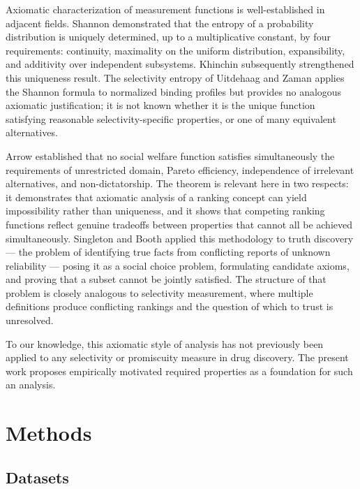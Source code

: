 \documentclass[journal=jcisd8,manuscript=article]{achemso}
\begin{document}
Axiomatic characterization of measurement functions is well-established in
adjacent fields.
Shannon\cite{Shannon1948} demonstrated that the entropy of a probability
distribution is uniquely determined, up to a multiplicative constant, by four
requirements: continuity, maximality on the uniform distribution,
expansibility, and additivity over independent subsystems.
Khinchin\cite{Khinchin1957} subsequently strengthened this uniqueness result.
The selectivity entropy of Uitdehaag and Zaman applies the Shannon formula to
normalized binding profiles but provides no analogous axiomatic justification;
it is not known whether it is the unique function satisfying reasonable
selectivity-specific properties, or one of many equivalent alternatives.

Arrow\cite{Arrow1951} established that no social welfare function satisfies
simultaneously the requirements of unrestricted domain, Pareto efficiency,
independence of irrelevant alternatives, and non-dictatorship.
The theorem is relevant here in two respects: it demonstrates that axiomatic
analysis of a ranking concept can yield impossibility rather than uniqueness,
and it shows that competing ranking functions reflect genuine tradeoffs between
properties that cannot all be achieved simultaneously.
Singleton and Booth\cite{Singleton2022} applied this methodology to truth
discovery --- the problem of identifying true facts from conflicting reports of
unknown reliability --- posing it as a social choice problem, formulating
candidate axioms, and proving that a subset cannot be jointly satisfied.
The structure of that problem is closely analogous to selectivity measurement,
where multiple definitions produce conflicting rankings and the question of
which to trust is unresolved.

To our knowledge, this axiomatic style of analysis has not previously been
applied to any selectivity or promiscuity measure in drug discovery.
The present work proposes empirically motivated required properties as a
foundation for such an analysis.

\section{Methods}
\label{sec:methods}

\subsection{Datasets}
\label{sec:methods:data}
\end{document}
